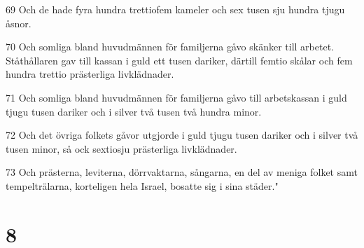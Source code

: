 \par 69 Och de hade fyra hundra trettiofem kameler och sex tusen sju hundra tjugu åsnor.
\par 70 Och somliga bland huvudmännen för familjerna gåvo skänker till arbetet. Ståthållaren gav till kassan i guld ett tusen dariker, därtill femtio skålar och fem hundra trettio prästerliga livklädnader.
\par 71 Och somliga bland huvudmännen för familjerna gåvo till arbetskassan i guld tjugu tusen dariker och i silver två tusen två hundra minor.
\par 72 Och det övriga folkets gåvor utgjorde i guld tjugu tusen dariker och i silver två tusen minor, så ock sextiosju prästerliga livklädnader.
\par 73 Och prästerna, leviterna, dörrvaktarna, sångarna, en del av meniga folket samt tempelträlarna, korteligen hela Israel, bosatte sig i sina städer."

\chapter{8}

